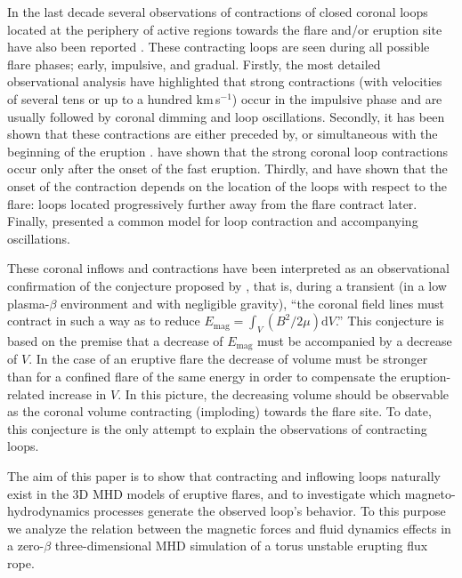 \documentclass[apj]{emulateapj}
\newcommand{\kps}{km\,s$^{-1}$}
\begin{document}
In the last decade several observations of contractions of closed coronal loops located at the periphery of active regions towards the flare and/or eruption site have also been reported \citep[e.g.,][]{Khan06a,Khan06b,Liu09b,Liu10a,Liu12a,Gosain12,Kallunki12,Sun12,Simoes13a,Shen14,Imada14,Kushwaha15,Petrie16,Dudik16}. These contracting loops are seen during all possible flare phases; early, impulsive, and gradual. Firstly, the most detailed observational analysis have highlighted that strong contractions (with velocities of several tens or up to a hundred \kps) occur in the impulsive phase and are usually followed by coronal dimming and loop oscillations. Secondly, it has been shown that these contractions are either preceded by, or simultaneous with the beginning of the eruption \citep[e.g.,][]{Liu12a,Shen14}.  \citet{Dudik16} have shown that the strong coronal loop contractions occur only after the onset of the fast eruption.  Thirdly, \cite{Gosain12} and \cite{Simoes13a} have shown that the onset of the contraction depends on the location of the loops with respect to the flare: loops located progressively further away from the flare contract later. Finally, \cite{Russell15} presented a common model for loop contraction and accompanying oscillations.

These coronal inflows and contractions have been interpreted as an observational confirmation of the conjecture proposed by \cite{Hudson00}, that is,  during a transient (in a low plasma-$\beta$ environment and with negligible gravity), ``the coronal field lines must contract in such a way as to reduce $E_\mathrm{mag} = \int_V (B^2/2\mu) \mathrm{d}V$.'' This conjecture is based on the premise that a decrease of $E_\mathrm{mag}$ must be accompanied by a decrease of $V$. In the case of an eruptive flare the decrease of volume must be stronger than for a confined flare of the same energy in order to compensate the eruption-related increase in $V$. In this picture, the decreasing volume should be observable as the coronal volume contracting (imploding) towards the flare site. To date, this  conjecture is the only attempt to explain the observations of contracting loops.

The aim of this paper is to show that contracting and inflowing loops naturally exist in the 3D MHD  models of eruptive flares, and to investigate which magneto-hydrodynamics processes generate the observed loop's behavior. To this purpose we analyze the relation between the magnetic forces and fluid dynamics effects in a zero-$\beta$ three-dimensional MHD simulation of a torus unstable erupting flux rope. 
\end{document}
